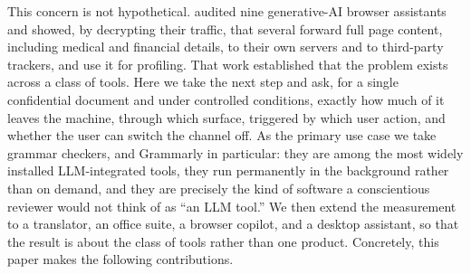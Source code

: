 \documentclass[sigconf,anonymous,review,balance=false]{acmart}
\begin{document}
This concern is not hypothetical. \citet{vekaria2025bighelp} audited nine generative-AI
browser assistants and showed, by decrypting their traffic, that several forward full page
content, including medical and financial details, to their own servers and to third-party
trackers, and use it for profiling. That work established that the problem exists across a
class of tools. Here we take the next step and ask, for a single confidential document and
under controlled conditions, exactly how much of it leaves the machine, through which
surface, triggered by which user action, and whether the user can switch the channel off.
As the primary use case we take grammar checkers, and Grammarly in particular: they are
among the most widely installed LLM-integrated tools, they run permanently in the
background rather than on demand, and they are precisely the kind of software a
conscientious reviewer would not think of as ``an LLM tool.'' We then extend the
measurement to a translator, an office suite, a browser copilot, and a desktop assistant,
so that the result is about the class of tools rather than one product. Concretely, this
paper makes the following contributions.
\end{document}
